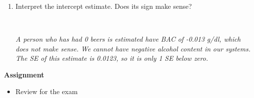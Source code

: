 \begin{enumerate}
\begin{enumerate}
\begin{key}
  {\it Each beer a person drinks is estimated to increase BAC by 0.018 g/dl}
\end{key}

\item Interpret the intercept estimate. Does its sign make sense?
\begin{students}
 \vspace{2cm}\\
\end{students}

\begin{key}
  {\it A person who has had 0 beers is estimated have BAC of -0.013
    g/dl, which does not make sense. We cannot have negative alcohol
    content in our systems. The SE of this estimate is 0.0123, so it
    is only 1 SE below zero.}
\end{key}
\end{enumerate}\vspace*{\fill}




\end{enumerate}
 



\noindent
{\bf Assignment} \vspace{-.2in}
\begin{itemize}
\item Review for the exam
\end{itemize}


  
 